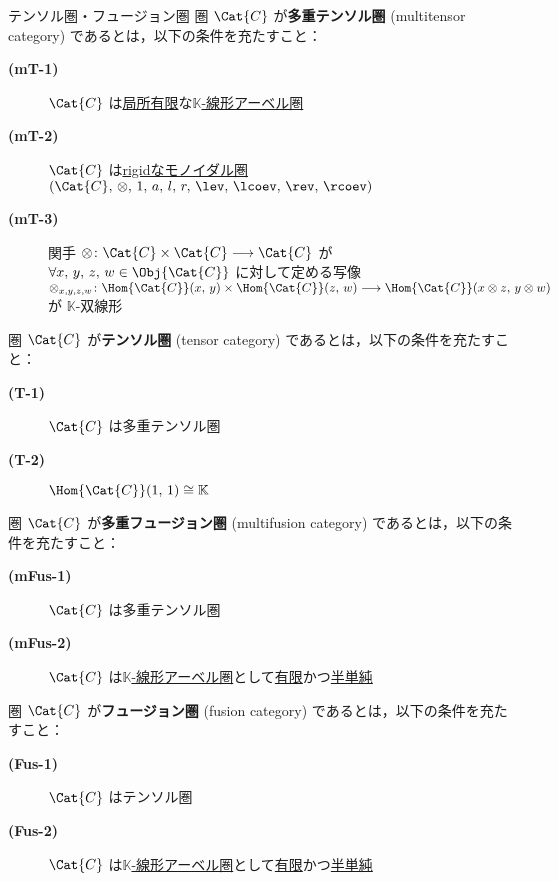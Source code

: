 \documentclass[TQFT_main]{subfiles}
\begin{document}
\begin{mydef}[label=def:tensorfusion-cat]{テンソル圏・フュージョン圏}
    圏 $\Cat{C}$ が\textbf{多重テンソル圏} (multitensor category) であるとは，以下の条件を充たすこと：
    \begin{description}
        \item[\textbf{(mT-1)}] $\Cat{C}$ は\hyperref[def:finite-abcat]{局所有限}な\hyperref[def:additive-cat]{$\mathbb{K}$-線形アーベル圏}
        \item[\textbf{(mT-2)}] $\Cat{C}$ は\hyperref[redef:rigid]{rigidなモノイダル圏} $(\Cat{C},\, \otimes,\, 1,\, a,\, l,\, r,\, \lev,\, \lcoev,\, \rev,\, \rcoev)$
        \item[\textbf{(mT-3)}] 関手 $\otimes \colon \Cat{C} \times \Cat{C} \lto \Cat{C}$ が $\forall x,\,y,\,z,\,w \in \Obj{\Cat{C}}$ に対して定める写像 $\otimes_{x,y,z,w} \colon \Hom{\Cat{C}} (x,\, y) \times \Hom{\Cat{C}} (z,\, w) \lto \Hom{\Cat{C}} (x \otimes z,\,  y \otimes w)$ が $\mathbb{K}$-双線形
    \end{description}
    圏 $\Cat{C}$ が\textbf{テンソル圏} (tensor category) であるとは，以下の条件を充たすこと：
    \begin{description}
        \item[\textbf{(T-1)}] $\Cat{C}$ は多重テンソル圏
        \item[\textbf{(T-2)}] $\Hom{\Cat{C}} (1,\, 1) \cong \mathbb{K}$ 
    \end{description}
    
    \tcblower

    圏 $\Cat{C}$ が\textbf{多重フュージョン圏} (multifusion category) であるとは，以下の条件を充たすこと：
    \begin{description}
        \item[\textbf{(mFus-1)}] $\Cat{C}$ は多重テンソル圏
        \item[\textbf{(mFus-2)}] $\Cat{C}$ は\hyperref[def:additive-cat]{$\mathbb{K}$-線形アーベル圏}として\hyperref[def:finite-abcat]{有限}かつ\hyperref[def:finite-abcat]{半単純}
    \end{description}
    圏 $\Cat{C}$ が\textbf{フュージョン圏} (fusion category) であるとは，以下の条件を充たすこと：
    \begin{description}
        \item[\textbf{(Fus-1)}] $\Cat{C}$ はテンソル圏
        \item[\textbf{(Fus-2)}] $\Cat{C}$ は\hyperref[def:additive-cat]{$\mathbb{K}$-線形アーベル圏}として\hyperref[def:finite-abcat]{有限}かつ\hyperref[def:finite-abcat]{半単純}
    \end{description}
\end{mydef}
\end{document}
